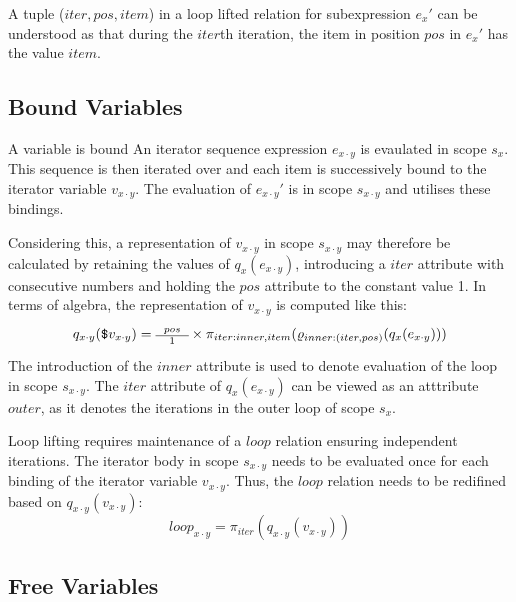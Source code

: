 A tuple ($iter,pos,item$) in a loop lifted relation for subexpression $e_{x}'$ can be understood as that during the
$iter$th iteration, the item in position $pos$ in $e_{x}'$ has the value $item$.

\subsection{Bound Variables}
\label{sect:trans:ll:boundVar}

A variable is bound
An iterator sequence expression $e_{x \cdot y}$ is evaulated in scope $s_{x}$. This sequence is then iterated over
and each item is successively bound to the iterator variable $v_{x \cdot y}$. The evaluation of $e_{x \cdot y}'$
is in scope $s_{x \cdot y}$ and utilises these bindings. 

Considering this, a representation of $v_{x \cdot y}$ in scope $s_{x \cdot y}$ may therefore be calculated by
retaining the values of $q_{x}(e_{x \cdot y})$, introducing a $iter$ attribute with consecutive numbers and
holding the $pos$ attribute to the constant value 1. In terms of algebra, the representation of $v_{x \cdot y}$ is
computed like this:
\begin{equation}
q_{x \cdot y}(\mbox{\texttt{\$}}v_{x \cdot y}) = \mbox{\scriptsize \begin{tabular}{c} $pos$ \\\hline 1
\end{tabular}} \times \pi_{iter:inner,item}(\varrho_{inner:(iter,pos)}(q_{x}(e_{x \cdot y})))
\label{eq:ll:qxy_vxy}
\end{equation}
The introduction of the $inner$ attribute is used to denote evaluation of the loop in scope $s_{x \cdot y}$. The
$iter$ attribute of $q_{x}(e_{x \cdot y})$ can be viewed as an atttribute $outer$, as it denotes the iterations in
the outer loop of scope $s_{x}$.

Loop lifting requires maintenance of a $loop$ relation ensuring independent iterations. The iterator body in
scope $s_{x \cdot y}$ needs to be evaluated once for each binding of the iterator variable $v_{x \cdot y}$.
Thus, the $loop$ relation needs to be redifined based on $q_{x \cdot y}(v_{x \cdot y})$:
\begin{equation}
loop_{x \cdot y} = \pi_{iter}(q_{x \cdot y}(v_{x \cdot y}))
\label{eq:ll:loopxy}
\end{equation}


\subsection{Free Variables}
\label{sect:trans:ll:freeVar}

